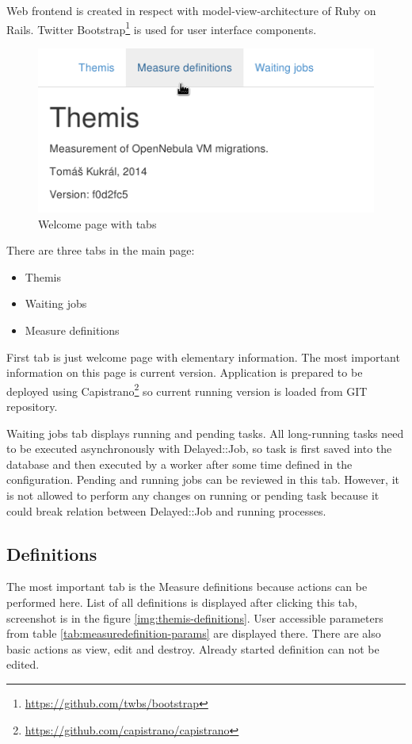 Web frontend is created in respect with model-view-architecture of Ruby on Rails. Twitter Bootstrap\footnote{\url{https://github.com/twbs/bootstrap}} is used for user interface components.

\begin{figure}[htb]
	\begin{center}
	\includegraphics[scale=0.5]{themis-tabs.png}
	\end{center}
	\caption{Welcome page with tabs}
	\label{img:themis-tabs}
\end{figure}


There are three tabs in the main page:
	\begin{itemize}
		\item Themis
		\item Waiting jobs
		\item Measure definitions
	\end{itemize}

First tab is just welcome page with elementary information. The most important information on this page is current version. Application is prepared to be deployed using Capistrano\footnote{\url{https://github.com/capistrano/capistrano}} so current running version is loaded from GIT repository.

Waiting jobs tab displays running and pending tasks. All long-running tasks need to be executed asynchronously with Delayed::Job, so task is first saved into the database and then executed by a worker after some time defined in the configuration. Pending and running jobs can be reviewed in this tab. However, it is not allowed to perform any changes on running or pending task because it could break relation between Delayed::Job and running processes.

\subsection{Definitions}
The most important tab is the Measure definitions because actions can be performed here. List of all definitions is displayed after clicking this tab, screenshot is in the figure \ref{img:themis-definitions}. User accessible parameters from table \ref{tab:measuredefinition-params} are displayed there. There are also basic actions as view, edit and destroy. Already started definition can not be edited.

